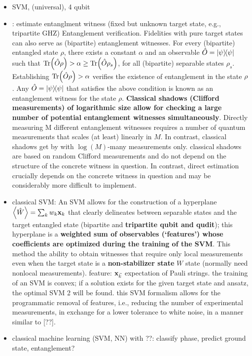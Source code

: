 \documentclass[
10pt,
aps,
pra,
linenumbers,
floatfix,
]{revtex4-2}
\theoremstyle{plain}
\theoremstyle{definition}
\newcommand{\ew}{\hat{W}}
\newcommand{\ob}{\hat{O}}
\newcommand{\dm}{\rho}
\begin{document}
\begin{itemize}
	\item SVM, (universal), 4 qubit \cite{vintskevichClassificationFourqubitEntangled2022}

	\item {} \cite{huangPredictingManyProperties2020}: estimate entanglment witness (fixed but unknown target state, e.g., tripartite GHZ)
	Entanglement verification. Fidelities with pure target states can also serve as (bipartite) entanglement witnesses. For every (bipartite) entangled state $\dm$, there exists a constant $\alpha$ and an observable $\ob = \op{\psi}$ such that $\Tr(\ob \dm ) > \alpha \ge \Tr(\ob \dm_s )$, for all (bipartite) separable states $\dm_s$. Establishing $\Tr(\ob \dm ) > \alpha$ verifies the existence of entanglement in the state $\dm$. Any $\ob = \op{\psi}$ that satisfies the above condition is known as an entanglement witness for the state $\dm$. 
	\textbf{Classical shadows (Clifford measurements) of logarithmic size allow for checking a large number of potential entanglement witnesses simultaneously}.
	Directly measuring M diﬀerent entanglement witnesses requires a number of quantum measurements that scales (at least) linearly in $M$. In contrast, classical shadows get by with $\log(M)$-many measurements only.
	classical shadows are based on random Clifford measurements and do not depend on the structure of the concrete witness in question. In contrast, direct estimation crucially depends on the concrete witness in question and may be considerably more diﬃcult to implement.

	\item classical SVM: An SVM allows for the construction of a hyperplane $\expval{\ew}=\sum_k w_k \vbx_{k}$ that clearly delineates between separable states and the target entangled state (bipartite and \textbf{tripartite qubit and qudit}); this hyperplane is a \textbf{weighted sum of observables (`features') whose coefficients are optimized during the training of the SVM}.
	This method the ability to obtain witnesses that require only local measurements even when the target state is a \textbf{non-stabilizer state} $W$ state (normally need nonlocal measurements).
	feature: $\vb{x}_{\vec{k}}$ expectation of Pauli strings.
	the training of an SVM is convex; if a solution exists for the given target state and ansatz, the optimal SVM 2 will be found.
	this SVM formalism allows for the programmatic removal of features, i.e., reducing the number of experimental measurements, in exchange for a lower tolerance to white noise, in a manner similar to [??].

	\item classical machine learning (SVM, NN) with  \cite{huangProvablyEfficientMachine2021}??: classify phase, predict ground state, entanglement?

\end{itemize}
\end{document}
